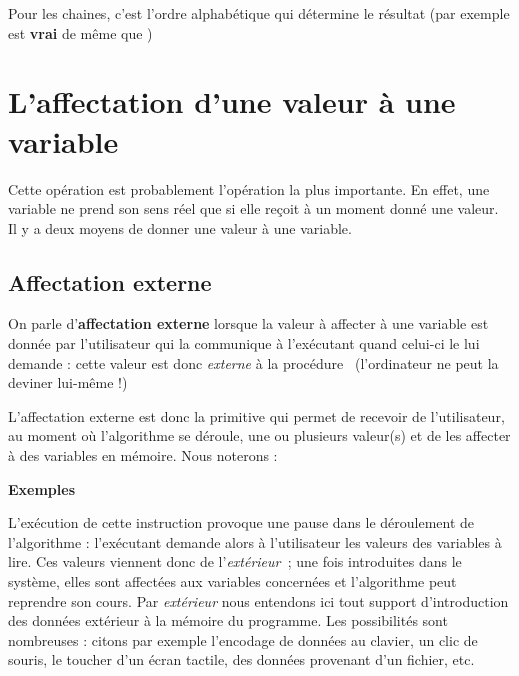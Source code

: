 			Pour les chaines, c'est l’ordre alphabétique qui
			détermine le résultat (par exemple
			 est \textbf{vrai} de même que
			\textstyleCodeInsr{${\leq}$})

	\section{L’affectation d’une valeur à une variable}

		Cette opération est probablement l’opération la plus importante. En
		effet, une variable ne prend son sens réel que si elle reçoit à un
		moment donné une valeur. Il y a deux moyens de donner une valeur à une
		variable.

		\subsection{Affectation externe }

			On parle d’\textbf{affectation externe} lorsque la valeur à affecter à
			une variable est donnée par l’utilisateur qui la communique à
			l’exécutant quand celui-ci le lui demande : cette valeur est donc
			\textit{externe} à la procédure \ (l’ordinateur ne peut la deviner
			lui-même !)

			L’affectation externe est donc la primitive qui permet de recevoir de
			l’utilisateur, au moment où l'algorithme se déroule,
			une ou plusieurs valeur(s) et de les affecter à des variables en
			mémoire. Nous noterons :

			
			{\bfseries Exemples}
			
			
			L’exécution de cette instruction provoque une
			pause dans le déroulement de l’algorithme : l’exécutant demande alors à
			l’utilisateur les valeurs des variables à lire. Ces valeurs viennent
			donc de l’\textit{extérieur~}; une fois introduites dans le système,
			elles sont affectées aux variables concernées et l’algorithme peut
			reprendre son cours. Par \textit{extérieur} nous entendons ici tout
			support d’introduction des données extérieur à la mémoire du programme.
			Les possibilités sont nombreuses : citons par exemple l’encodage de
			données au clavier, un clic de souris, le toucher d'un
			écran tactile, des données provenant d’un fichier, etc.

